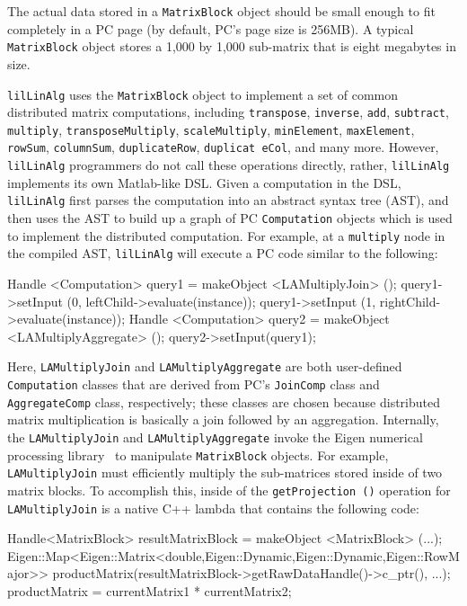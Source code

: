The actual data stored in a \texttt{MatrixBlock} object should be small enough to fit completely in 
a PC page (by default, PC's page size is 256MB).  A typical \texttt{MatrixBlock} object stores a
1,000 by 1,000 sub-matrix that is eight megabytes in size.

\texttt{lilLinAlg} uses the \texttt{MatrixBlock} object to implement a set of common distributed matrix
computations, including \texttt{transpose},
\texttt{inverse}, \texttt{add}, \texttt{subtract}, \texttt{multiply}, \texttt{transposeMultiply}, 
\texttt{scaleMultiply}, \texttt{minElement},
\texttt{maxElement}, \texttt{rowSum}, \texttt{columnSum},
\texttt{duplicateRow}, \texttt{duplicat eCol}, 
and many more.  However, \texttt{lilLinAlg} programmers do not call these operations directly, rather,
\texttt{lilLinAlg} implements its own Matlab-like DSL.  
Given a computation in the DSL, \texttt{lilLinAlg} first parses the computation into an abstract syntax tree (AST), and then
uses the AST to build up a graph of PC \texttt{Computation} objects which is used to implement the distributed computation.
For example, at a \texttt{multiply} node in the compiled AST, \texttt{lilLinAlg} 
will execute a PC code similar to the following:

\begin{codesmall}
Handle <Computation> query1 = makeObject <LAMultiplyJoin> ();
query1->setInput (0, leftChild->evaluate(instance));
query1->setInput (1, rightChild->evaluate(instance));
Handle <Computation> query2 = makeObject <LAMultiplyAggregate> ();
query2->setInput(query1);
\end{codesmall}

\noindent Here, \texttt{LAMultiplyJoin} and \texttt{LAMultiplyAggregate} are 
both user-defined \texttt{Computation} classes that are
derived from PC's \texttt{JoinComp} class and \texttt{AggregateComp} class, respectively; these classes are chosen 
because distributed matrix multiplication
is basically a join followed by an aggregation.
Internally, the \texttt{LAMultiplyJoin}
and \texttt{LAMultiplyAggregate} invoke the Eigen numerical processing
library~\cite{eigen} to manipulate \texttt{MatrixBlock} objects.
For example, \texttt{LAMultiplyJoin} must efficiently multiply the sub-matrices stored inside of two matrix blocks.
To accomplish this, inside of the \texttt{getProjection ()} operation for
\texttt{LAMultiplyJoin} is a native C++ lambda that contains the following code:

\begin{code}
Handle<MatrixBlock> resultMatrixBlock = makeObject <MatrixBlock> (...);
Eigen::Map<Eigen::Matrix<double,Eigen::Dynamic,Eigen::Dynamic,Eigen::RowMajor>> 
   productMatrix(resultMatrixBlock->getRawDataHandle()->c_ptr(), ...);
productMatrix = currentMatrix1 * currentMatrix2;
\end{code}

